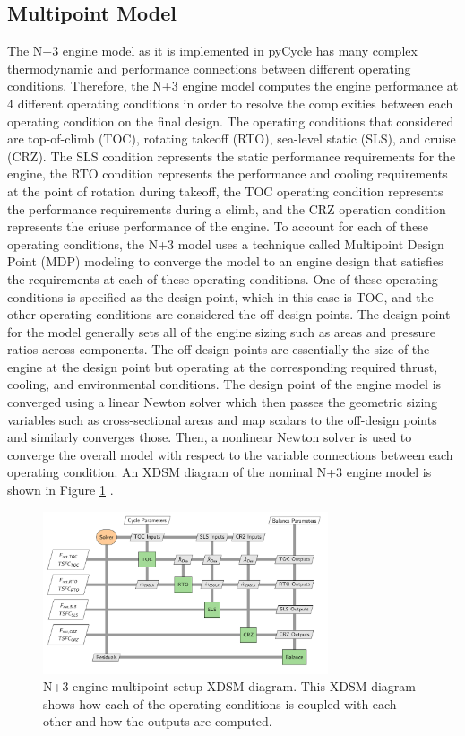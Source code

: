 \documentclass[conf]{new-aiaa}
\begin{document}
\subsection{Multipoint Model}
The N+3 engine model as it is implemented in pyCycle has many complex thermodynamic and performance connections between different operating conditions.
Therefore, the N+3 engine model computes the engine performance at 4 different operating conditions in order to resolve the complexities between each operating condition on the final design.
The operating conditions that considered are top-of-climb (TOC), rotating takeoff (RTO), sea-level static (SLS), and cruise (CRZ).
The SLS condition represents the static performance requirements for the engine, the RTO condition represents the performance and cooling requirements at the point of rotation during takeoff, the TOC operating condition represents the performance requirements during a climb, and the CRZ operation condition represents the criuse performance of the engine.
To account for each of these operating conditions, the N+3 model uses a technique called Multipoint Design Point (MDP) modeling to converge the model to an engine design that satisfies the requirements at each of these operating conditions.
One of these operating conditions is specified as the design point, which in this case is TOC, and the other operating conditions are considered the off-design points.
The design point for the model generally sets all of the engine sizing such as areas and pressure ratios across components.
The off-design points are essentially the size of the engine at the design point but operating at the corresponding required thrust, cooling, and environmental conditions.
The design point of the engine model is converged using a linear Newton solver which then passes the geometric sizing variables such as cross-sectional areas and map scalars to the off-design points and similarly converges those.
Then, a nonlinear Newton solver is used to converge the overall model with respect to the variable connections between each operating condition.
An XDSM diagram of the nominal N+3 engine model is shown in Figure \ref{fig:N3_xdsm} \cite{Hendricks2019}.

\begin{figure}[hbt!]
    \centering
    \includegraphics[width=0.75\textwidth]{N3_xdsm.pdf}
    \caption{
        N+3 engine multipoint setup XDSM diagram.
        This XDSM diagram shows how each of the operating conditions is coupled with each other and how the outputs are computed.
    }
    \label{fig:N3_xdsm}
\end{figure}
\end{document}
